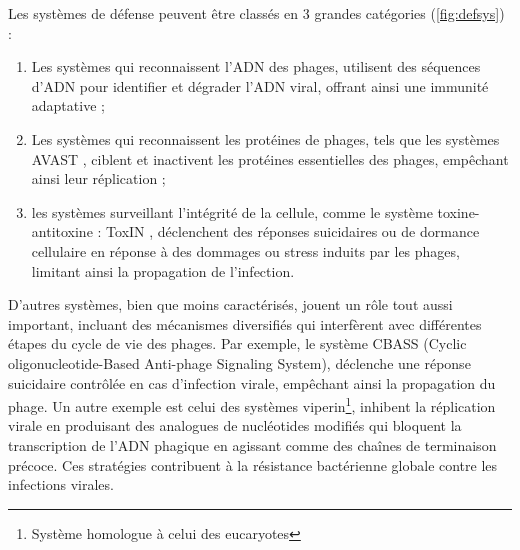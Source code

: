 Les systèmes de défense peuvent être classés en 3 grandes catégories (\autoref{fig:defsys}) :
\begin{enumerate}[label=(\roman*)]
    \item Les systèmes qui reconnaissent l'ADN des phages, utilisent des séquences d'ADN pour identifier et dégrader l'ADN viral, offrant ainsi une immunité adaptative ;
    \item Les systèmes qui reconnaissent les protéines de phages, tels que les systèmes AVAST \cite{gao_diverse_2020}, ciblent et inactivent les protéines essentielles des phages, empêchant ainsi leur réplication ;
    \item les systèmes surveillant l'intégrité de la cellule, comme le système toxine-antitoxine : ToxIN \cite{guegler_shutoff_2021}, déclenchent des réponses suicidaires ou de dormance cellulaire en réponse à des dommages ou stress induits par les phages, limitant ainsi la propagation de l'infection.
\end{enumerate}

D’autres systèmes, bien que moins caractérisés, jouent un rôle tout aussi important, incluant des mécanismes diversifiés qui interfèrent avec différentes étapes du cycle de vie des phages. Par exemple, le système CBASS (Cyclic oligonucleotide-Based Anti-phage Signaling System), déclenche une réponse suicidaire contrôlée en cas d'infection virale, empêchant ainsi la propagation du phage. Un autre exemple est celui des systèmes viperin\footnote{Système homologue à celui des eucaryotes}, inhibent la réplication virale en produisant des analogues de nucléotides modifiés qui bloquent la transcription de l'ADN phagique en agissant comme des chaînes de terminaison précoce. Ces stratégies contribuent à la résistance bactérienne globale contre les infections virales.

